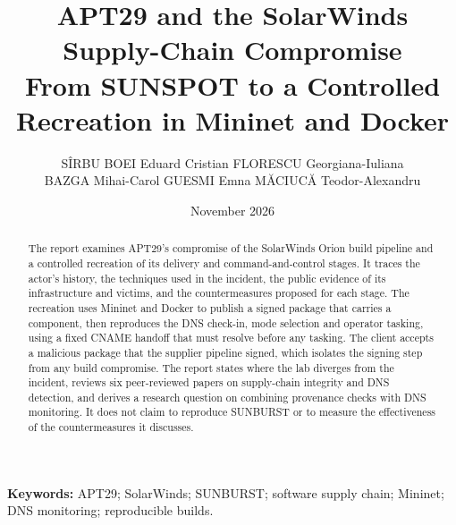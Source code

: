 \documentclass[11pt,a4paper]{article}
\title{\textbf{APT29 and the SolarWinds Supply-Chain Compromise}\\[0.4em]
\large From SUNSPOT to a Controlled Recreation in Mininet and Docker}
\author{
S\^IRBU BOE\cb{T}I Eduard Cristian \quad FLORESCU Georgiana-Iuliana \\
BAZGA Mihai-Carol \quad GUESMI Emna \quad M\u{A}CIUC\u{A} Teodor-Alexandru
}
\date{November 2026}
\begin{document}
\maketitle

\begin{abstract}
\noindent
The report examines APT29's compromise of the SolarWinds Orion build pipeline and a controlled recreation of its delivery and command-and-control stages. It traces the actor's history, the techniques used in the incident, the public evidence of its infrastructure and victims, and the countermeasures proposed for each stage. The recreation uses Mininet and Docker to publish a signed package that carries a component, then reproduces the DNS check-in, mode selection and operator tasking, using a fixed CNAME handoff that must resolve before any tasking. The client accepts a malicious package that the supplier pipeline signed, which isolates the signing step from any build compromise. The report states where the lab diverges from the incident, reviews six peer-reviewed papers on supply-chain integrity and DNS detection, and derives a research question on combining provenance checks with DNS monitoring. It does not claim to reproduce SUNBURST or to measure the effectiveness of the countermeasures it discusses.
\end{abstract}

{\raggedright{}\noindent\textbf{Keywords:} APT29; SolarWinds; SUNBURST; software supply chain; Mininet; DNS monitoring; reproducible builds.\par}

\vspace{1em}














\clearpage

\end{document}
